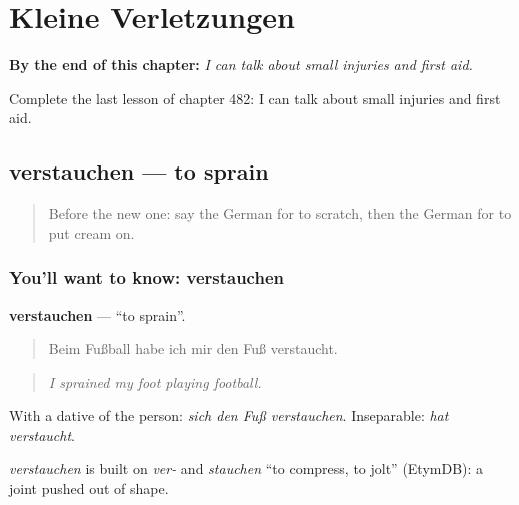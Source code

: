 
\chapter{Kleine Verletzungen}
\label{ch:ge-kleine-verletzungen}

\begin{chapteropening}
\textbf{By the end of this chapter:} \emph{I can talk about small injuries and first aid.}

Complete the last lesson of chapter 482: I can talk about small injuries and first aid.
\end{chapteropening}

\section[verstauchen]{verstauchen — to sprain}

\label{lesson:GE-C482-verstauchen}



\begin{quote}
Before the new one: say the German for to scratch, then the German for to put cream on.
\end{quote}

\subsection*{You'll want to know: verstauchen}
\textbf{verstauchen} — \textquotedblleft{}to sprain\textquotedblright{}.

\begin{quote}
Beim Fußball habe ich mir den Fuß verstaucht.
\end{quote}

\begin{quote}
\emph{I sprained my foot playing football.}
\end{quote}

With a dative of the person: \emph{sich den Fuß verstauchen}. Inseparable: \emph{hat verstaucht}.

\begin{cousinweb}
\emph{verstauchen} is built on \emph{ver-} and \emph{stauchen} \textquotedblleft{}to compress, to jolt\textquotedblright{} (EtymDB): a joint pushed out of shape.
\end{cousinweb}

